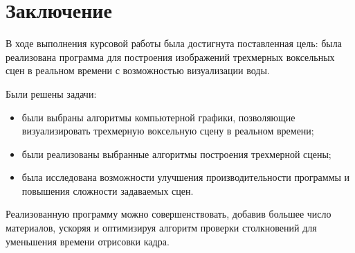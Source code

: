 \chapter*{Заключение}

В ходе выполнения курсовой работы была достигнута поставленная цель:
была реализована программа для построения 
изображений трехмерных воксельных сцен в реальном времени с возможностью визуализации воды.

Были решены задачи:
\begin{itemize}
    \item были выбраны алгоритмы компьютерной 
          графики, позволяющие визуализировать трехмерную воксельную
          сцену в реальном времени;
    \item были реализованы выбранные алгоритмы построения трехмерной сцены;
    \item была исследована возможности улучшения производительности программы
          и повышения сложности задаваемых сцен.
\end{itemize}

Реализованную программу можно совершенствовать, 
добавив большее число материалов, ускоряя и оптимизируя алгоритм 
проверки столкновений для уменьшения времени отрисовки кадра.
